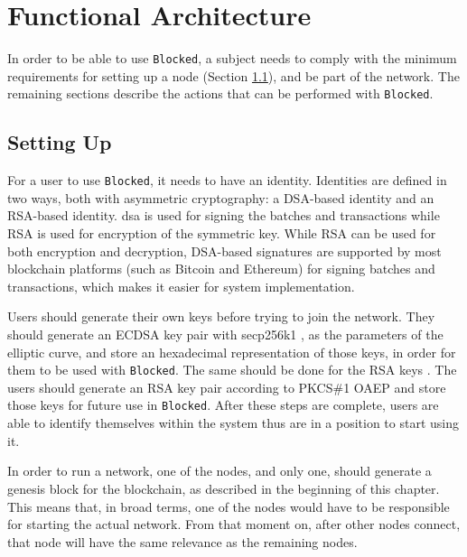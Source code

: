 \section{Functional Architecture}
\label{sec:design-interaction}

In order to be able to use \texttt{Blocked}, a subject needs to comply with the minimum requirements for setting up a node (Section \ref{sec:design-setup}), and be part of the network. The remaining sections describe the actions that can be performed with \texttt{Blocked}.

\subsection{Setting Up}
\label{sec:design-setup}

For a user to use \texttt{Blocked}, it needs to have an identity. Identities are defined in two ways, both with asymmetric cryptography: a DSA-based identity and an RSA-based identity. \gls{dsa} \cite{cameron_f._kerry_digital_2013} is used for signing the batches and transactions while RSA \cite{rivest_method_1978} is used for encryption of the symmetric key. While RSA \cite{rivest_method_1978} can be used for both encryption and decryption, DSA-based signatures are supported by most blockchain platforms (such as Bitcoin and Ethereum) for signing batches and transactions, which makes it easier for system implementation.

Users should generate their own keys before trying to join the network. They should generate an ECDSA \cite{johnson_elliptic_2001} key pair with secp256k1 \cite{secp256k1}, as the parameters of the elliptic curve, and store an hexadecimal representation of those keys, in order for them to be used with \texttt{Blocked}. The same should be done for the RSA keys \cite{rivest_method_1978}. The users should generate an RSA \cite{rivest_method_1978} key pair according to PKCS\#1 OAEP \cite{moriarty_pkcs_2016} and store those keys for future use in \texttt{Blocked}. After these steps are complete, users are able to identify themselves within the system thus are in a position to start using it.

In order to run a network, one of the nodes, and only one, should generate a genesis block for the blockchain, as described in the beginning of this chapter. This means that, in broad terms, one of the nodes would have to be responsible for starting the actual network. From that moment on, after other nodes connect, that node will have the same relevance as the remaining nodes.

